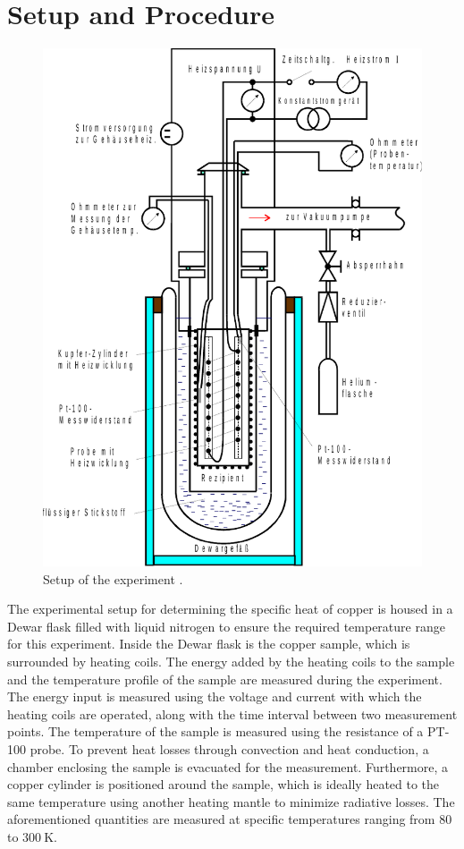 \section{Setup and Procedure}
\begin{figure}[h]
    \centering
    \includegraphics[scale=0.65]{Aufbau.pdf}
    \caption{Setup of the experiment \cite{V47}.}
    \label{fig:aufbau}
\end{figure}
The experimental setup for determining the specific heat of copper is housed in a Dewar flask filled with liquid nitrogen to ensure the 
required temperature range for this experiment. Inside the Dewar flask is the copper sample, which is surrounded by heating coils. The 
energy added by the heating coils to the sample and the temperature profile of the sample are measured during the experiment. The energy 
input is measured using the voltage and current with which the heating coils are operated, along with the time interval between two measurement 
points. The temperature of the sample is measured using the resistance of a PT-100 probe. To prevent heat losses through convection and heat 
conduction, a chamber enclosing the sample is evacuated for the measurement. Furthermore, a copper cylinder is positioned around the sample, 
which is ideally heated to the same temperature using another heating mantle to minimize radiative losses. The aforementioned quantities are 
measured at specific temperatures ranging from $80$ to $\SI{300}{\kelvin}$.
